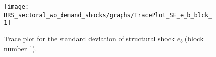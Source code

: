 \begin{figure}[H]
\centering
  \texttt{[image: BRS\_sectoral\_wo\_demand\_shocks/graphs/TracePlot\_SE\_e\_b\_blck\_1]}\\
    \caption{Trace plot for the standard deviation of structural shock ${e_b}$ (block number 1).}
\end{figure}
